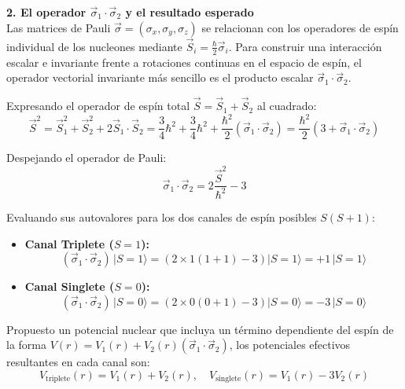 \begin{problema}
\textbf{2. El operador $\vec{\sigma}_1 \cdot \vec{\sigma}_2$ y el resultado esperado}\\
Las matrices de Pauli $\vec{\sigma} = (\sigma_x, \sigma_y, \sigma_z)$ se relacionan con los operadores de espín individual de los nucleones mediante $\vec{S}_i = \frac{\hbar}{2} \vec{\sigma}_i$. Para construir una interacción escalar e invariante frente a rotaciones continuas en el espacio de espín, el operador vectorial invariante más sencillo es el producto escalar $\vec{\sigma}_1 \cdot \vec{\sigma}_2$.

Expresando el operador de espín total $\vec{S} = \vec{S}_1 + \vec{S}_2$ al cuadrado:
\begin{equation}
\vec{S}^2 = \vec{S}_1^2 + \vec{S}_2^2 + 2\vec{S}_1 \cdot \vec{S}_2 = \frac{3}{4}\hbar^2 + \frac{3}{4}\hbar^2 + \frac{\hbar^2}{2} (\vec{\sigma}_1 \cdot \vec{\sigma}_2) = \frac{\hbar^2}{2} \left( 3 + \vec{\sigma}_1 \cdot \vec{\sigma}_2 \right)
\end{equation}

Despejando el operador de Pauli:
\begin{equation}
\vec{\sigma}_1 \cdot \vec{\sigma}_2 = 2 \frac{\vec{S}^2}{\hbar^2} - 3
\end{equation}

Evaluando sus autovalores para los dos canales de espín posibles $S(S+1)$:
\begin{itemize}
    \item \textbf{Canal Triplete ($S = 1$):}
    \begin{equation}
    (\vec{\sigma}_1 \cdot \vec{\sigma}_2) \, |S=1\rangle = \left( 2 \times 1(1+1) - 3 \right) |S=1\rangle = +1 \, |S=1\rangle
    \end{equation}
    \item \textbf{Canal Singlete ($S = 0$):}
    \begin{equation}
    (\vec{\sigma}_1 \cdot \vec{\sigma}_2) \, |S=0\rangle = \left( 2 \times 0(0+1) - 3 \right) |S=0\rangle = -3 \, |S=0\rangle
    \end{equation}
\end{itemize}

Propuesto un potencial nuclear que incluya un término dependiente del espín de la forma $V(r) = V_1(r) + V_2(r) (\vec{\sigma}_1 \cdot \vec{\sigma}_2)$, los potenciales efectivos resultantes en cada canal son:
\begin{equation}
V_{\text{triplete}}(r) = V_1(r) + V_2(r), \quad V_{\text{singlete}}(r) = V_1(r) - 3 V_2(r)
\end{equation}


\end{problema}
